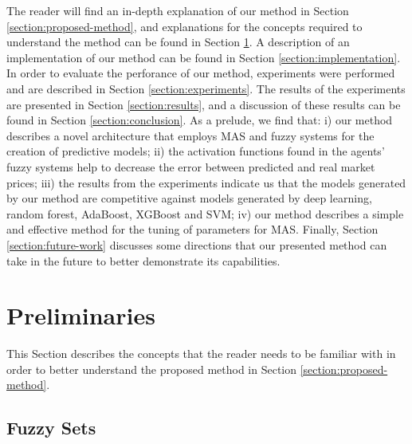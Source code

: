 ﻿\documentclass{ieeeaccess}
\begin{document}
The reader will find an in-depth explanation of our method in Section
\ref{section:proposed-method}, and explanations for the concepts
required to understand the method can be found in Section
\ref{section:preliminaries}. A description of an implementation of our method can be
found in Section \ref{section:implementation}. In order to evaluate
the perforance of our method, experiments were performed and are
described in Section \ref{section:experiments}. The results of the
experiments are presented in Section \ref{section:results}, and a
discussion of these results can be found in Section
\ref{section:conclusion}. As a prelude, we find that: i) our method
describes a novel architecture that employs MAS and fuzzy systems for
the creation of predictive models; ii) the activation functions found
in the agents' fuzzy systems help to decrease the error between
predicted and real market prices; iii) the results from the
experiments indicate us that the models generated by our method are
competitive against models generated by deep learning, random forest,
AdaBoost, XGBoost and SVM; iv) our method
describes a simple and effective method for the tuning of parameters
for MAS. Finally, Section \ref{section:future-work}
discusses some directions that our presented method can take in the
future to better demonstrate its capabilities.

\section{Preliminaries}
\label{section:preliminaries}
%

This Section describes the concepts that the reader needs to be familiar with in
order to better understand the proposed method in Section
\ref{section:proposed-method}.%
\subsection{Fuzzy Sets}
\label{subsection:fuzzy-sets}
\end{document}
